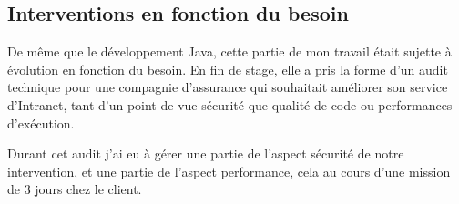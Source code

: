 \subsection{Interventions en fonction du besoin}
De même que le développement Java, cette partie de mon travail était sujette à évolution en fonction du besoin. En fin de stage, elle a pris la forme d'un audit technique pour une compagnie d'assurance qui souhaitait améliorer son service d'Intranet, tant d'un point de vue sécurité que qualité de code ou performances d'exécution.

Durant cet audit j'ai eu à gérer une partie de l'aspect sécurité de notre intervention, et une partie de l'aspect performance, cela au cours d'une mission de 3 jours chez le client.